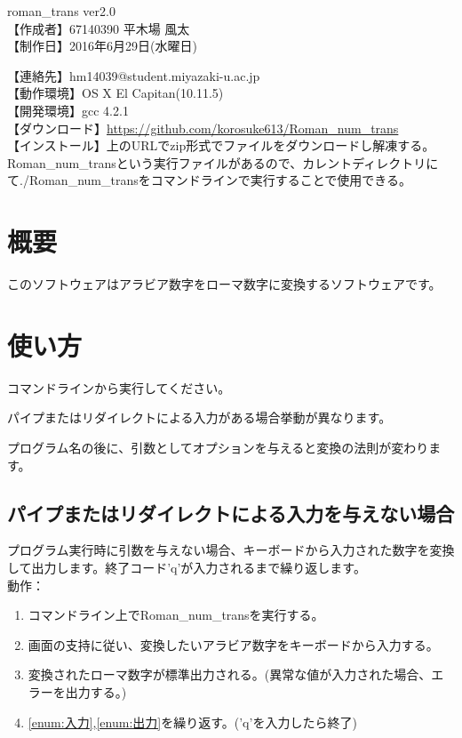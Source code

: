 \documentclass{jsarticle}
\begin{document}
\noindent
{\Huge roman\_trans ver2.0}\\ 
{\large【作成者】67140390 平木場 風太}\\
{\large【制作日】2016年6月29日(水曜日)}\\
{\large【連絡先】hm14039@student.miyazaki-u.ac.jp\\
{\large【動作環境】OS X El Capitan(10.11.5)}\\
{\large【開発環境】gcc 4.2.1}\\
{\large【ダウンロード】\url{https://github.com/korosuke613/Roman_num_trans}}\\
{\large【インストール】上のURLでzip形式でファイルをダウンロードし解凍する。Roman\_num\_transという実行ファイルがあるので、カレントディレクトリにて./Roman\_num\_transをコマンドラインで実行することで使用できる。}\\


\section{概要}
このソフトウェアはアラビア数字をローマ数字に変換するソフトウェアです。
\\

\section{使い方}
コマンドラインから実行してください。

パイプまたはリダイレクトによる入力がある場合挙動が異なります。

プログラム名の後に、引数としてオプションを与えると変換の法則が変わります。

\subsection{パイプまたはリダイレクトによる入力を与えない場合}
プログラム実行時に引数を与えない場合、キーボードから入力された数字を変換して出力します。終了コード'q'が入力されるまで繰り返します。\\

動作：
\begin{enumerate}
  \item コマンドライン上でRoman\_num\_transを実行する。
  \item 画面の支持に従い、変換したいアラビア数字をキーボードから入力する。 \label{enum:入力}
  \item 変換されたローマ数字が標準出力される。(異常な値が入力された場合、エラーを出力する。) 
  	\label{enum:出力}
  \item \ref{enum:入力},\ref{enum:出力}を繰り返す。('q'を入力したら終了)\\
\end{enumerate}

}
\end{document}
